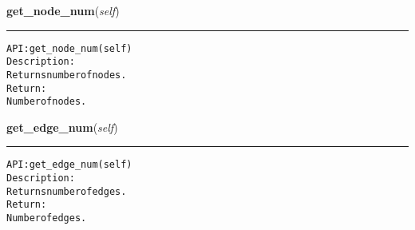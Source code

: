     \vspace{0.5ex}

\hspace{.8\funcindent}\begin{boxedminipage}{\funcwidth}

    \raggedright \textbf{get\_node\_num}(\textit{self})

    \vspace{-1.5ex}

    \rule{\textwidth}{0.5\fboxrule}
\setlength{\parskip}{2ex}
\begin{alltt}

API: get\_node\_num(self)
Description:
Returns number of nodes.
Return:
    Number of nodes.
\end{alltt}

\setlength{\parskip}{1ex}
    \end{boxedminipage}

    \label{coinor:gimpy:graph:Graph:get_edge_num}

    \vspace{0.5ex}

\hspace{.8\funcindent}\begin{boxedminipage}{\funcwidth}

    \raggedright \textbf{get\_edge\_num}(\textit{self})

    \vspace{-1.5ex}

    \rule{\textwidth}{0.5\fboxrule}
\setlength{\parskip}{2ex}
\begin{alltt}

API: get\_edge\_num(self)
Description:
Returns number of edges.
Return:
    Number of edges.
\end{alltt}

\setlength{\parskip}{1ex}
    \end{boxedminipage}

    \label{coinor:gimpy:graph:Graph:get_node_attr}

    \vspace{0.5ex}

